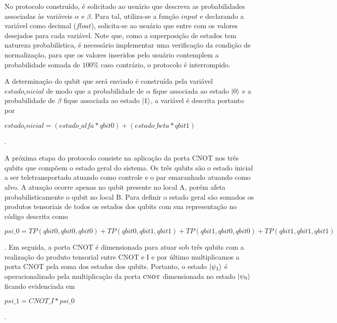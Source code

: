 No protocolo construído, é solicitado ao usuário que descreva as probabilidades associadas às variáveis $\alpha$ e $\beta$. Para tal, utiliza-se a função \textit{$input$} e declarando a variável como decimal (\textit{$float$}), solicita-se ao usuário que entre com os valores desejados para cada variável. Note que, como a superposição de estados tem natureza probabilística, é necessário implementar uma verificação da condição de normalização, para que os valores inseridos pelo usuário contemplem a probabilidade somada de $100\%$ caso contrário, o protocolo é interrompido.

A determinação do qubit que será enviado é construída pela variável \textit{$estado_inicial$} de modo que a probabilidade de $\alpha$ fique associada ao estado $\ket{0}$ e a probabilidade de $\beta$ fique associada ao estado $\ket{1}$, a variável é descrita portanto por \begin{tiny}\textbf{$estado_inicial = (estado\_alfa * qbit0) + (estado\_beta * qbit1)$}\end{tiny}.

A próxima etapa do protocolo consiste na aplicação da porta CNOT nos três qubits que compõem o estado geral do sistema. Os três qubits são o estado inicial a ser teletransportado atuando como controle e o par emaranhado atuando como alvo. A atuação ocorre apenas no qubit presente no local A, porém afeta probabilisticamente o qubit no local B. Para definir o estado geral são somados os produtos tensoriais de todos os estados dos qubits com sua representação no código descrita como \begin{tiny}\textbf{$psi\_0 = TP(qbit0, qbit0, qbit0) + TP(qbit0, qbit1, qbit1) + TP(qbit1,qbit0, qbit0) + TP(qbit1,qbit1,qbit1)$}\end{tiny}. Em seguida, a porta CNOT é dimensionada para atuar sob três qubits com a realização do produto tensorial entre CNOT e I e por último multiplicamos a porta CNOT pela soma dos estados dos qubits. Portanto, o estado $\ket{\psi_1}$ é operacionalizado pela multiplicação da porta \(\operatorname{\textsc{cnot}}\) dimensionada no estado $\ket{\psi_0}$ ficando evidenciada em \begin{tiny}\textbf{$psi\_1 = CNOT\_I * psi\_0$}\end{tiny}.

